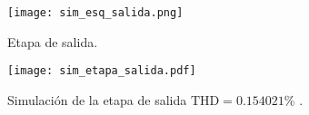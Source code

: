 \begin{figure}[H]
	\centering
	\texttt{[image: sim\_esq\_salida.png]}
	\caption{Etapa de salida.}
	\label{fig.sim_esq_salida}
\end{figure}


\begin{figure}[H]
	\centering
	\texttt{[image: sim\_etapa\_salida.pdf]}
	\caption{Simulación de la etapa de salida $\mathrm{THD} =0.154021\%$ .}
	\label{fig.salida}
\end{figure}
